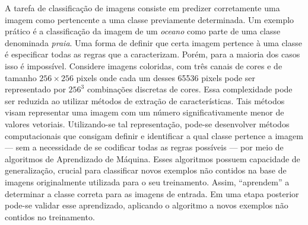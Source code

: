 A tarefa de classificação de imagens consiste em predizer corretamente uma imagem como pertencente a uma classe previamente determinada. Um exemplo prático é a classificação da imagem de um \textit{oceano} como parte de uma classe denominada \textit{praia}. Uma forma de definir que certa imagem pertence à uma classe é especificar todas as regras que a caracterizam.
Porém, para a maioria dos casos isso é impossível. Considere imagens coloridas, com três canais de cores e de tamanho $256\times256$ pixels onde cada um desses 65536 pixels pode ser representado por $256^3$ combinações discretas de cores. Essa complexidade pode ser reduzida ao utilizar métodos de extração de características. Tais métodos visam representar uma imagem com um número significativamente menor de valores vetoriais. Utilizando-se tal representação, pode-se desenvolver métodos computacionais que consigam definir e identificar a qual classe pertence a imagem --- sem a necessidade de se codificar todas as regras possíveis --- por meio de algoritmos de Aprendizado de Máquina. Esses algoritmos possuem capacidade de generalização, crucial para classificar novos exemplos não contidos na base de imagens originalmente utilizada para o seu treinamento. Assim, ``aprendem'' a determinar a classe correta para as imagens de entrada. Em uma etapa posterior pode-se validar esse aprendizado, aplicando o algoritmo a novos exemplos não contidos no treinamento.

